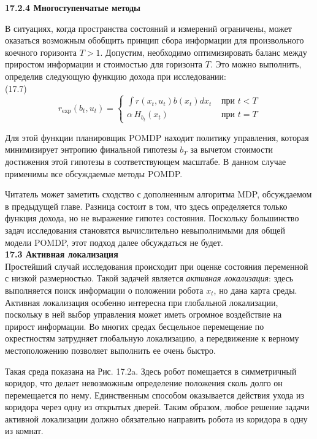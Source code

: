 \documentclass[10pt,a4paper]{article}
\begin{document}
\textbf{17.2.4	Многоступенчатые методы}

В ситуациях, когда пространства состояний и измерений ограничены, может оказаться возможным обобщить принцип сбора информации для произвольного коечного горизонта $T>1$. Допустим, необходимо оптимизировать баланс между приростом информации и стоимостью для горизонта $T$. Это можно выполнить, определив следующую функцию дохода при исследовании:\\

(17.7)
\begin{equation*}
r_{\exp}(b_t,u_t)= \left\{
\begin{array}{ll}
\int r(x_t,u_t)b(x_t)dx_t& \mbox{ при } t < T \\
\alpha\,H_{b_t}(x_t)& \mbox{ при } t = T
\end{array}
\right.
\end{equation*}

Для этой функции планировщик POMDP находит политику управления, которая минимизирует энтропию финальной гипотезы $b_T$ за вычетом стоимости достижения этой гипотезы в соответствующем масштабе. В данном случае применимы все обсуждаемые методы POMDP.

Читатель может заметить сходство с дополненным алгоритма MDP, обсуждаемом в предыдущей главе. Разница состоит в том, что здесь определяется только функция дохода, но не выражение гипотез состояния. Поскольку большинство задач исследования становятся вычислительно невыполнимыми для общей модели POMDP, этот подход далее обсуждаться не будет.\\

\textbf{17.3	Активная локализация}\\

Простейший случай исследования происходит при оценке состояния переменной с низкой размерностью. Такой задачей является \textit{активная локализация}: здесь выполняется поиск информации о положении робота $x_t$, но дана карта среды. Активная локализация особенно интересна при глобальной локализации, поскольку в ней выбор управления может иметь огромное воздействие на прирост информации. Во многих средах бесцельное перемещение по окрестностям затрудняет глобальную локализацию, а передвижение к верному местоположению позволяет выполнить ее очень быстро.

Такая среда показана на Рис. 17.2a. Здесь робот помещается в симметричный коридор, что делает невозможным определение положения сколь долго он перемещается по нему. Единственным способом оказывается действия ухода из коридора через одну из открытых дверей. Таким образом, любое решение задачи активной локализации должно обязательно направить робота из коридора в одну из комнат.
\end{document}
